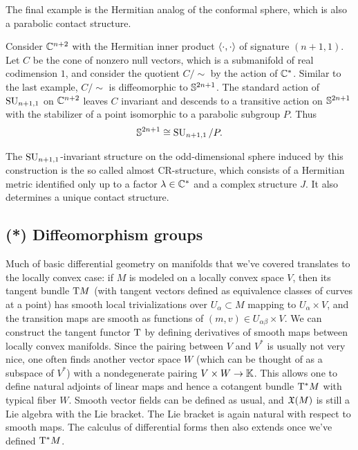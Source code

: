 The final example is the Hermitian analog of the conformal sphere, which is also a parabolic contact structure.

\begin{example}[CR-sphere]
    Consider $\mathbb{C}^{n+2}$ with the Hermitian inner product $\langle\cdot,\cdot\rangle$ of signature $(n+1,1)$. Let $C$ be the cone of nonzero null vectors, which is a submanifold of real codimension $1$, and consider the quotient $C\slash \sim$ by the action of $\mathbb{C}^\ast$. Similar to the last example, $C\slash \sim$ is diffeomorphic to $\mathbb{S}^{2n+1}$. The standard action of $\operatorname{SU}_{n+1,1}$ on $\mathbb{C}^{n+2}$ leaves $C$ invariant and descends to a transitive action on $\mathbb{S}^{2n+1}$ with the stabilizer of a point isomorphic to a parabolic subgroup $P$. Thus 
    \[\mathbb{S}^{2n+1}\cong \operatorname{SU}_{n+1,1}\slash P.\]
\end{example}

The $\operatorname{SU}_{n+1,1}$-invariant structure on the odd-dimensional sphere induced by this construction is the so called almost CR-structure, which consists of a Hermitian metric identified only up to a factor $\lambda\in\mathbb{C}^\ast$ and a complex structure $J$. It also determines a unique contact structure.








\subsection{(*) Diffeomorphism groups}\label{sec: Diff groups}


Much of basic differential geometry on manifolds that we've covered translates to the locally convex case: if $M$ is modeled on a locally convex space $V$, then its tangent bundle $\mathrm{T} M$ (with tangent vectors defined as equivalence classes of curves at a point) has smooth local trivializations over $U_\alpha\subset M$ mapping to $U_\alpha\times V$, and the transition maps are smooth as functions of $(m,v)\in U_{\alpha\beta}\times V$. We can construct the tangent functor $\mathrm{T}$ by defining derivatives of smooth maps between locally convex manifolds. Since the pairing between $V$ and $V^\ast$ is usually not very nice, one often finds another vector space $W$ (which can be thought of as a subspace of $V^\ast$) with a nondegenerate pairing $V\times W\to \mathbb{K}$. This allows one to define natural adjoints of linear maps and hence a cotangent bundle $\mathrm{T}^\ast M$ with typical fiber $W$. Smooth vector fields can be defined as usual, and $\mathfrak{X}(M)$ is still a Lie algebra with the Lie bracket. The Lie bracket is again natural with respect to smooth maps. The calculus of differential forms then also extends once we've defined $\mathrm{T}^\ast M$.

